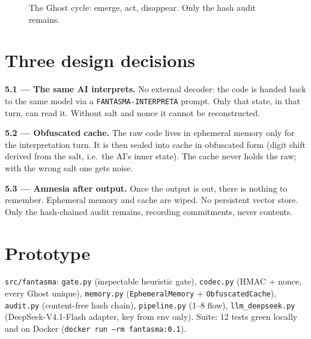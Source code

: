 \documentclass[11pt,a4paper]{article}
\begin{document}
\begin{figure}[h]
\centering
{}
\caption{The Ghost cycle: emerge, act, disappear. Only the hash audit remains.}
\end{figure}

\section{Three design decisions}
\textbf{5.1 --- The same AI interprets.} No external decoder: the code is handed back
to the same model via a \texttt{FANTASMA-INTERPRETA} prompt. Only that state, in that
turn, can read it. Without salt and nonce it cannot be reconstructed.

\textbf{5.2 --- Obfuscated cache.} The raw code lives in ephemeral memory only for the
interpretation turn. It is then sealed into cache in obfuscated form (digit shift derived
from the salt, i.e.\ the AI's inner state). The cache never holds the raw; with the wrong
salt one gets noise.

\textbf{5.3 --- Amnesia after output.} Once the output is out, there is nothing to remember.
Ephemeral memory and cache are wiped. No persistent vector store. Only the hash-chained
audit remains, recording commitments, never contents.

\section{Prototype}
\texttt{src/fantasma}: \texttt{gate.py} (inspectable heuristic gate),
\texttt{codec.py} (HMAC + nonce, every Ghost unique),
\texttt{memory.py} (\texttt{EphemeralMemory} + \texttt{ObfuscatedCache}),
\texttt{audit.py} (content-free hash chain),
\texttt{pipeline.py} (1--8 flow),
\texttt{llm\_deepseek.py} (DeepSeek-V4.1-Flash adapter, key from env only).
Suite: 12 tests green locally and on Docker (\texttt{docker run --rm fantasma:0.1}).
\end{document}
